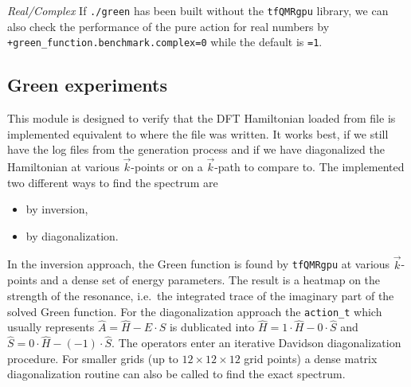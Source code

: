 \documentclass[oribibl]{llncs}
\newcommand{\ttt}[1]{\texttt{#1}}
\begin{document}
%
\noindent
\emph{Real/Complex} If \ttt{./green} has been built without the \ttt{tfQMRgpu} library, we can also check the performance of the pure action for real numbers by \ttt{+green\_function.benchmark.complex=0} while the default is \ttt{=1}.

\subsection{Green experiments}
This module is designed to verify that the \ac{DFT} Hamiltonian loaded from file is implemented equivalent to
where the file was written.
It works best, if we still have the log files from the generation process and if we have diagonalized the Hamiltonian at various $\vec{k}$-points or on a $\vec{k}$-path to compare to.
The implemented two different ways to find the spectrum are
\begin{itemize}
  \item by inversion,
  \item by diagonalization.
\end{itemize}
In the inversion approach, the Green function is found by \ttt{tfQMRgpu} at various $\vec{k}$-points and a dense set of energy parameters.
The result is a heatmap on the strength of the resonance, i.e.~the integrated trace of the imaginary part of the solved Green function.
For the diagonalization approach the \ttt{action\_t} which usually represents $\hat A = \hat H - E\cdot \hat S$ is dublicated into $\hat H = 1\cdot \hat H - 0\cdot\hat S$ and $\hat S = 0\cdot \hat H - (-1)\cdot\hat S$.
The operators enter an iterative Davidson diagonalization procedure. For smaller grids (up to $12 \times 12 \times 12$ grid points) a dense matrix diagonalization routine can also be called to find the exact spectrum.


\newpage

 

\end{document}
